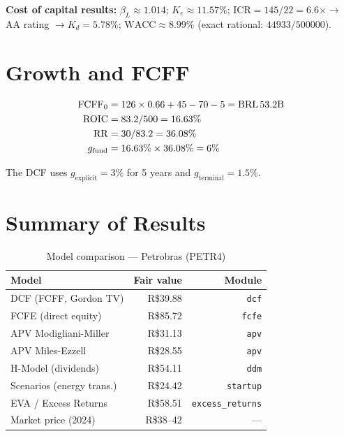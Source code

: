 \documentclass[12pt, a4paper, oneside]{book}
\newcommand{\FCFF}{\ensuremath{\mathrm{FCFF}}}
\newcommand{\WACC}{\ensuremath{\mathrm{WACC}}}
\newcommand{\ROIC}{\ensuremath{\mathrm{ROIC}}}
\newcommand{\Ke}{K_e}
\newcommand{\Kd}{K_d}
\newcommand{\RR}{\mathrm{RR}}
\begin{document}
\textbf{Cost of capital results:}
$\beta_L \approx 1.014$; $\Ke \approx 11.57\%$;
ICR$= 145/22 = 6.6\times \to$ AA rating $\to \Kd = 5.78\%$;
$\WACC \approx 8.99\%$ (exact rational: $44933/500000$).

\section{Growth and FCFF}

\begin{align*}
  \FCFF_0 &= 126 \times 0.66 + 45 - 70 - 5 = \text{BRL\,}53.2\text{B} \\
  \ROIC   &= 83.2/500 = 16.63\% \\
  \RR     &= 30/83.2 = 36.08\% \\
  g_{\text{fund}} &= 16.63\% \times 36.08\% = 6\%
\end{align*}

The DCF uses $g_{\text{explicit}} = 3\%$ for 5 years and
$g_{\text{terminal}} = 1.5\%$.

\section{Summary of Results}

\begin{table}[h]
\centering
\caption{Model comparison --- Petrobras (PETR4)}
\label{tab:resultados}
\begin{tabular}{lrr}
\toprule
\textbf{Model} & \textbf{Fair value} & \textbf{Module} \\
\midrule
DCF (FCFF, Gordon TV)    & R\$39.88 & \texttt{dcf} \\
FCFE (direct equity)     & R\$85.72 & \texttt{fcfe} \\
APV Modigliani-Miller    & R\$31.13 & \texttt{apv} \\
APV Miles-Ezzell         & R\$28.55 & \texttt{apv} \\
H-Model (dividends)      & R\$54.11 & \texttt{ddm} \\
Scenarios (energy trans.)& R\$24.42 & \texttt{startup} \\
EVA / Excess Returns     & R\$58.51 & \texttt{excess\_returns} \\
\midrule
Market price (2024)      & R\$38--42 & --- \\
\bottomrule
\end{tabular}
\end{table}
\end{document}
